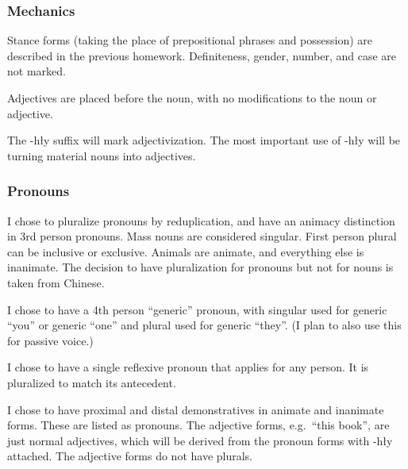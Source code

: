 \documentclass[12pt]{article}
\begin{document}
    \subsubsection*{Mechanics}

    Stance forms (taking the place of prepositional phrases and possession)
    are described in the previous homework.
    Definiteness, gender, number, and case are not marked.

    Adjectives are placed before the noun,
    with no modifications to the noun or adjective.

    The -hły suffix will mark adjectivization.
    The most important use of -hły will be turning material nouns into adjectives.

    \subsubsection*{Pronouns}

    I chose to pluralize pronouns by reduplication,
    and have an animacy distinction in 3rd person pronouns.
    Mass nouns are considered singular.
    First person plural can be inclusive or exclusive.
    Animals are animate, and everything else is inanimate.
    The decision to have pluralization for pronouns
    but not for nouns is taken from Chinese.

    I chose to have a 4th person ``generic'' pronoun,
    with singular used for generic ``you'' or generic ``one''
    and plural used for generic ``they''.
    (I plan to also use this for passive voice.)

    I chose to have a single reflexive pronoun
    that applies for any person.
    It is pluralized to match its antecedent.

    I chose to have proximal and distal demonstratives
    in animate and inanimate forms.
    These are listed as pronouns.
    The adjective forms, e.g.\ ``this book'', are just normal adjectives,
    which will be derived from the pronoun forms with -hły attached.
    The adjective forms do not have plurals.
\end{document}

